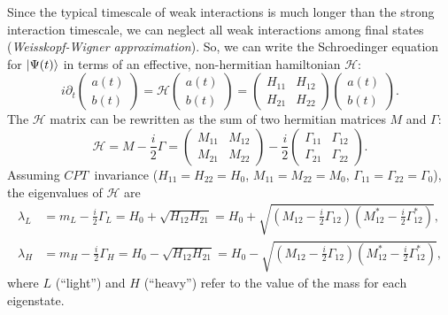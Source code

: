 Since the typical timescale of weak interactions is much longer than the strong interaction timescale,
we can neglect all weak interactions among final states (\emph{Weisskopf-Wigner approximation}). 
So, we can write the Schroedinger equation for $|\Psi(t)\rangle$ in terms of an effective, non-hermitian 
hamiltonian $\mathcal H$:
\begin{equation}
	\label{eq:schroedinger}
	i\partial_t \left( \begin{array}{c} a(t) \\ b(t) \end{array} \right) = \mathcal H \left( \begin{array}{c} a(t) \\ b(t) \end{array} \right) = 
	\left( \begin{array}{cc} H_{11} & H_{12} \\ H_{21} & H_{22} \end{array} \right) \left( \begin{array}{c} a(t) \\ b(t) \end{array} \right). 
\end{equation} 
The $\mathcal H$ matrix can be rewritten as the sum of two hermitian matrices $M$ and $\Gamma$:
\begin{equation}
	\label{eq:effhamiltonian}
	\mathcal H = M - \frac{i}{2} \Gamma = 
	\left( \begin{array}{cc} M_{11} & M_{12} \\ M_{21} & M_{22} \end{array} \right) - \frac{i}{2} \left( \begin{array}{cc} \Gamma_{11} & \Gamma_{12} \\ \Gamma_{21} & \Gamma_{22} \end{array} \right).
\end{equation}
Assuming $CPT$~invariance ($H_{11}=H_{22}=H_0$, $M_{11}=M_{22}=M_0$, $\Gamma_{11}=\Gamma_{22}=\Gamma_0$), the eigenvalues of $\mathcal H$ are
\begin{align}
	\lambda_{L} &= m_{L} - \frac{i}{2}\Gamma_{L} = H_0 + \sqrt{H_{12}H_{21}} = H_0 + \sqrt{\left(M_{12}-\frac{i}{2}\Gamma_{12}\right)\left(M_{12}^*-\frac{i}{2}\Gamma_{12}^*\right)}, \\
	\lambda_{H} &= m_{H} - \frac{i}{2}\Gamma_{H} = H_0 - \sqrt{H_{12}H_{21}} = H_0 - \sqrt{\left(M_{12}-\frac{i}{2}\Gamma_{12}\right)\left(M_{12}^*-\frac{i}{2}\Gamma_{12}^*\right)},
\end{align}
where $L$ (``light'') and $H$ (``heavy'') refer to the value of the mass for each eigenstate.
